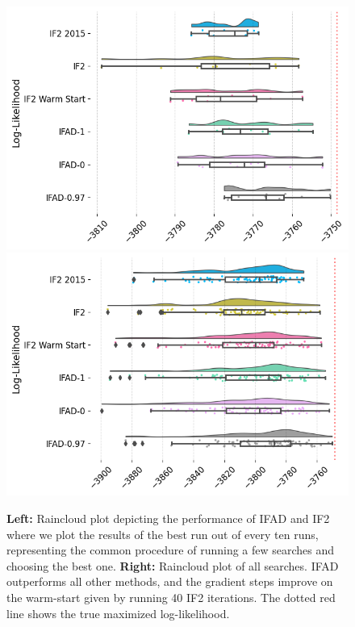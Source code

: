 \documentclass[9pt,twocolumn,pnasresearcharticle]{pnas-new}
\newcommand\arxiv[2]{#2} %
\begin{document}
\begin{figure}[ht]
    \includegraphics[width=\arxiv{8cm}{\textwidth/\real{4.2}}]{imgs/095/boxplot.png}
    \includegraphics[width=\arxiv{8cm}{\textwidth/\real{4.2}}]{imgs/095/boxplot_all.png}
    \caption{\textbf{Left:} Raincloud plot depicting the performance of IFAD and IF2 where we plot the results of the best run out of every ten runs, representing the common procedure of running a few searches and choosing the best one. \textbf{Right:} Raincloud plot of all searches. IFAD outperforms all other methods, and the gradient steps improve on the warm-start given by running 40 IF2 iterations.
    The dotted red line shows the true maximized log-likelihood.}
    \label{fig:boxplot}
\end{figure}
\end{document}
